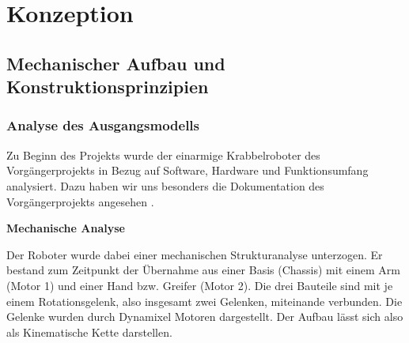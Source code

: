 \section{Konzeption}
\label{sec:konzeption}


\subsection{Mechanischer Aufbau und Konstruktionsprinzipien}

\subsubsection{Analyse des Ausgangsmodells}

Zu Beginn des Projekts wurde der einarmige Krabbelroboter des Vorgängerprojekts in Bezug auf Software, Hardware und Funktionsumfang analysiert. Dazu haben wir uns besonders die Dokumentation des Vorgängerprojekts angesehen \cite{vorgängerprojekt}. 

\textbf{Mechanische Analyse}

Der Roboter wurde dabei einer mechanischen Strukturanalyse unterzogen. Er bestand zum Zeitpunkt der Übernahme aus einer Basis (Chassis) mit einem Arm (Motor 1) und einer Hand bzw. Greifer (Motor 2). Die drei Bauteile sind mit je einem Rotationsgelenk, also insgesamt zwei Gelenken, miteinande verbunden. Die Gelenke wurden durch Dynamixel Motoren dargestellt. Der Aufbau lässt sich also als Kinematische Kette darstellen.


